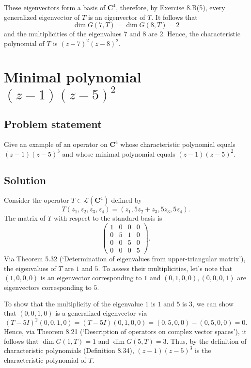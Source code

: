 \documentclass{article}
\begin{document}
These eigenvectors form a basis of $\mathbf{C}^4$, therefore, by Exercise 8.B(5), every generalized eigenvector of $T$ is an eigenvector of $T$. 
It follows that
\[\operatorname{dim}G(7,T)=\operatorname{dim}G (8, T) = 2\]
and the multiplicities of the eigenvalues $7$ and $8$ are 2. 
Hence, the characteristic polynomial of $T$ is $(z-7)^2(z-8)^2$.

\clearpage

\section{Minimal polynomial $(z-1)(z-5)^2$}
\subsection*{Problem statement}
Give an example of an operator on $\mathbf{C}^4$ whose characteristic polynomial equals $(z-1)(z-5)^3$ and whose minimal polynomial equals $(z-1)(z-5)^2$.

\subsection*{Solution}
Consider the operator $T\in\mathcal{L}(\mathbf{C}^4)$ defined by
\begin{equation*}
T(z_1,z_2,z_3,z_4)=(z_1,5z_2+z_3,5z_3,5z_4).
\end{equation*}
The matrix of $T$ with respect to the standard basis is
\begin{equation*}
\begin{pmatrix}
1 & 0 & 0 & 0\\
0 & 5 & 1 & 0\\
0 & 0 & 5 & 0\\
0 & 0 & 0 & 5
\end{pmatrix}.
\end{equation*}
Via Theorem 5.32 (`Determination of eigenvalues from upper-triangular matrix'), the eigenvalues of $T$ are $1$ and $5$. 
To assess their multiplicities, let's note that $(1,0,0,0)$ is an eigenvector corresponding to $1$ and $(0,1,0,0),(0,0,0,1)$ are eigenvectors corresponding to $5$. 

To show that the multiplicity of the eigenvalue $1$ is $1$ and $5$ is $3$, we can show that $(0,0,1,0)$ is a generalized eigenvector via
\[(T-5I)^2(0,0,1,0)=(T-5I)(0,1,0,0)=(0,5,0,0)-(0,5,0,0)=0.\]
Hence, via Theorem 8.21 (`Description of operators on complex vector spaces'), it follows that $\operatorname{dim}G(1,T)=1$ and $\operatorname{dim}G(5,T)=3$. 
Thus, by the definition of characteristic polynomials (Definition 8.34), $(z-1)(z-5)^3$ is the characteristic polynomial of $T$.
\end{document}
